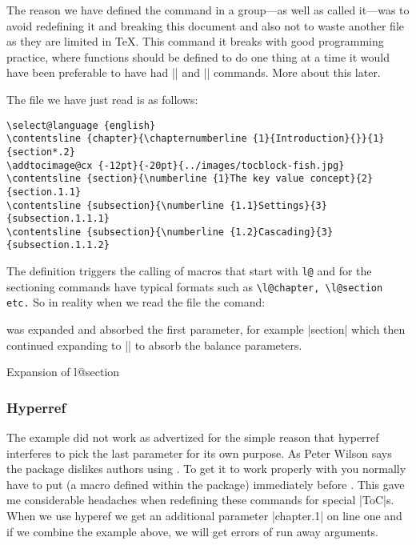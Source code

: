 The reason we have defined the command in a group---as well as called it---was to avoid redefining it and breaking this document and also not to waste another file as they are limited in TeX. This command it breaks with good programming practice, where functions should be defined to do one thing at a time it would have been preferable to have had |\@readtoc| and  |\@writetoc| commands. More about this later.

The file we have just read is as follows:

\begin{verbatim}
\select@language {english}
\contentsline {chapter}{\chapternumberline {1}{Introduction}{}}{1}{section*.2}
\addtocimage@cx {-12pt}{-20pt}{../images/tocblock-fish.jpg}
\contentsline {section}{\numberline {1}The key value concept}{2}{section.1.1}
\contentsline {subsection}{\numberline {1.1}Settings}{3}{subsection.1.1.1}
\contentsline {subsection}{\numberline {1.2}Cascading}{3}{subsection.1.1.2}
\end{verbatim}

The  definition triggers the calling of macros that start with \verb+l@+ and for the sectioning commands have typical formats such as \lstinline{\l@chapter, \l@section etc.} So in reality when we read the
file the comand:
\begin{teX}
\def\contentsline#1{\csname l@#1\endcsname}
\end{teX}
was expanded and absorbed the first parameter, for example |{section}| which then continued expanding to |\l@section| to absorb the balance parameters.

\begin{texexample}{Expansion of l@section}{}
\makeatletter
{}
\makeatother
\end{texexample}

\subsubsection{Hyperref}

The example did not work as advertized for the simple reason that hyperref interferes to pick the last parameter for its own purpose. As Peter Wilson says the  package dislikes authors using
. To get it to work properly with   you normally have to put  (a macro defined within  the  package) immediately  before . This gave me considerable headaches when redefining these commands for special |ToC|s.
When we use hyperef we get an additional parameter |chapter.1| on line one and if we combine the example above, we will get errors of run away arguments.

